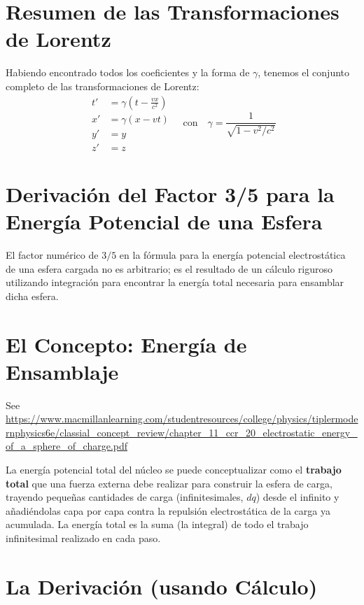 \documentclass[11pt,a4paper]{book}
\begin{document}
\section*{Resumen de las Transformaciones de Lorentz}
Habiendo encontrado todos los coeficientes y la forma de $\gamma$, tenemos el conjunto completo de las transformaciones de Lorentz:
\[
\boxed{
\begin{aligned}
t' &= \gamma \left( t - \frac{vx}{c^2} \right) \\
x' &= \gamma (x - vt) \\
y' &= y \\
z' &= z
\end{aligned}
\quad \text{con} \quad
\gamma = \frac{1}{\sqrt{1 - v^2/c^2}}
}
\]


\section{Derivación del Factor 3/5 para la Energía Potencial de una Esfera}
\label{sec:3_5}

El factor numérico de $3/5$ en la fórmula para la energía potencial electrostática de una esfera cargada no es arbitrario; es el resultado de un cálculo riguroso utilizando integración para encontrar la energía total necesaria para ensamblar dicha esfera.

\section{El Concepto: Energía de Ensamblaje}

See \url{https://www.macmillanlearning.com/studentresources/college/physics/tiplermodernphysics6e/classial_concept_review/chapter_11_ccr_20_electrostatic_energy_of_a_sphere_of_charge.pdf}

La energía potencial total del núcleo se puede conceptualizar como el \textbf{trabajo total} que una fuerza externa debe realizar para construir la esfera de carga, trayendo pequeñas cantidades de carga (infinitesimales, $dq$) desde el infinito y añadiéndolas capa por capa contra la repulsión electrostática de la carga ya acumulada. La energía total es la suma (la integral) de todo el trabajo infinitesimal realizado en cada paso.

\section{La Derivación (usando Cálculo)}
\end{document}
